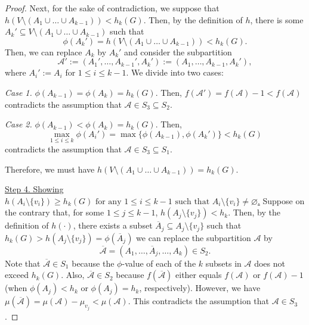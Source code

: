 \documentclass[12pt, reqno]{article}
\begin{document}
\begin{proof}
Next, for the sake of contradiction, we suppose that $h(V\setminus(A_1\cup\dots\cup A_{k-1}))<h_k(G)$. Then, by the definition of $h$, there is some $A_k'\subseteq V\setminus(A_1\cup\dots\cup A_{k-1})$ such that \[\phi(A_k')=h(V\setminus(A_1\cup\dots\cup A_{k-1}))<h_k(G).\] Then, we can replace $A_k$ by $A_k'$ and consider the subpartition \[\mathcal A':=(A_1',\dots,A_{k-1}',A_k'):=(A_1,\dots,A_{k-1},A_k'),\] where $A_i':=A_i$ for $1\le i\le k-1$. We divide into two cases:

\vspace{0.3cm}

\noindent\textsl{Case 1.} $\phi(A_{k-1})=\phi(A_k)=h_k(G)$.
\newline Then, $f(\mathcal A')=f(\mathcal A)-1<f(\mathcal A)$ contradicts the assumption that $\mathcal A\in S_3\subseteq S_2$.

\vspace{0.3cm}

\noindent\textsl{Case 2.} $\phi(A_{k-1})<\phi(A_k)=h_k(G)$.
\newline Then, \[\max_{1\le i\le k}\phi(A_i')=\max\{\phi(A_{k-1}),\phi(A_k')\}<h_k(G)\] contradicts the assumption that $\mathcal A\in S_3\subseteq S_1$.

\vspace{0.3cm}

Therefore, we must have $h(V\setminus(A_1\cup\dots\cup A_{k-1}))=h_k(G)$. 

\vspace{0.3cm}

\noindent\underline{Step 4. Showing $h(A_i\setminus\{v_i\})\ge h_k(G)\text{ for any }1\le i\le k-1\text{ such that }A_i\setminus\{v_i\}\ne\varnothing$.}
\newline\noindent Suppose on the contrary that, for some $1\le j\le k-1$, $h(A_j\setminus\{v_j\})<h_k$. Then, by the definition of $h(\cdot)$, there exists a subset $\overline A_j\subseteq A_j\setminus\{v_j\}$ such that $h_k(G)>h(A_j\setminus\{v_j\})=\phi(\overline A_j)$ we can replace the subpartition $\mathcal A$ by \[\overline{\mathcal A}=(A_1,\dots,\overline A_j,\dots,A_k)\in S_2.\] Note that $\overline{\mathcal A}\in S_1$ because the $\phi$-value of each of the $k$ subsets in $\mathcal A$ does not exceed $h_k(G)$. Also, $\overline{\mathcal A}\in S_2$ because $f(\overline{\mathcal A})$ either equals $f(\mathcal A)$ or $f(\mathcal A)-1$ (when $\phi(A_j)<h_k$ or $\phi(A_j)=h_k$, respectively). However, we have $\mu(\overline{\mathcal A})=\mu(\mathcal A)-\mu_{v_j}<\mu(\mathcal A)$. This contradicts the assumption that $\mathcal A\in S_3$.


\end{proof}
\end{document}
